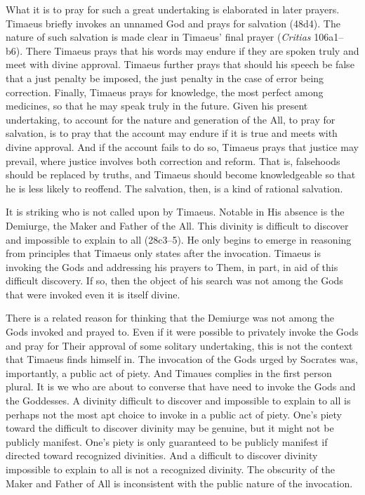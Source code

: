 What it is to pray for such a great undertaking is elaborated in later prayers. Timaeus briefly invokes an unnamed God and prays for salvation (48d4). The nature of such salvation is made clear in Timaeus' final prayer (\emph{Critias} 106a1–b6). There Timaeus prays that his words may endure if they are spoken truly and meet with divine approval. Timaeus further prays that should his speech be false that a just penalty be imposed, the just penalty in the case of error being correction. Finally, Timaeus prays for knowledge, the most perfect among medicines, so that he may speak truly in the future. Given his present undertaking, to account for the nature and generation of the All, to pray for salvation, is to pray that the account may endure if it is true and meets with divine approval. And if the account fails to do so, Timaeus prays that  justice may prevail, where justice involves both correction and reform. That is, falsehoods should be replaced by truths, and Timaeus should become knowledgeable so that he is less likely to reoffend. The salvation, then, is a kind of rational salvation.

It is striking who is not called upon by Timaeus. Notable in His absence is the Demiurge, the Maker and Father of the All. This divinity is difficult to discover and impossible to explain to all (28c3–5). He only begins to emerge in reasoning from principles that Timaeus only states after the invocation. Timaeus is invoking the Gods and addressing his prayers to Them, in part, in aid of this difficult discovery. If so, then the object of his search was not among the Gods that were invoked even it is itself divine.

There is a related reason for thinking that the Demiurge was not among the Gods invoked and prayed to. Even if it were possible to privately invoke the Gods and pray for Their approval of some solitary undertaking, this is not the context that Timaeus finds himself in. The invocation of the Gods urged by Socrates was, importantly, a public act of piety. And Timaues complies in the first person plural. It is we who are about to converse that have need to invoke the Gods and the Goddesses. A divinity difficult to discover and impossible to explain to all is perhaps not the most apt choice to invoke in a public act of piety. One's piety toward the difficult to discover divinity may be genuine, but it might not be publicly manifest. One's piety is only guaranteed to be publicly manifest if directed toward recognized divinities. And a difficult to discover divinity impossible to explain to all is not a recognized divinity. The obscurity of the Maker and Father of All is inconsistent with the public nature of the invocation.

